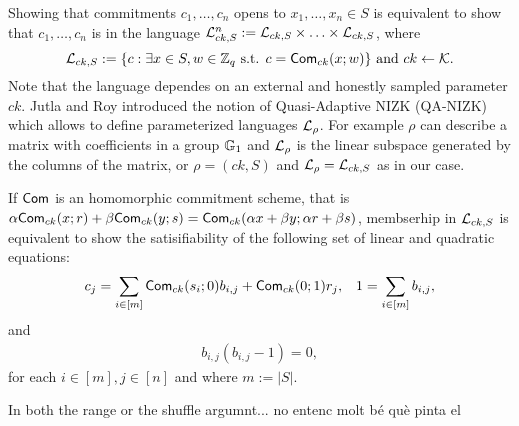 Showing that commitments $c_1,\ldots,c_n$ opens to $x_1,\ldots,x_n\in S$ is equivalent to show that $c_1,\ldots,c_n$ is in the language $\mathcal{L}_{ck,S}^n:=\mathcal{L}_{ck,S}\times\ldots\times\mathcal{L}_{ck,S}$, where
$$
\mathcal{L}_{ck,S}:=\{c:\exists x\in S, w\in\mathbb{Z}_q \text{ s.t. } c=\mathsf{Com}_{ck}(x;w)\}\text{ and }ck\gets\mathcal{K}.
$$
Note that the language dependes on an external and honestly sampled parameter $ck$. Jutla and Roy introduced the notion of Quasi-Adaptive NIZK (QA-NIZK) \cite{AC:JutRoy13} which allows to define parameterized languages $\mathcal{L}_{\rho}$. For example $\rho$ can describe a matrix with coefficients in a group $\mathbb{G}_1$ and $\mathcal{L}_{\rho}$ is the linear subspace generated by the columns of the matrix, or $\rho=(ck,S)$ and $\mathcal{L}_{\rho}=\mathcal{L}_{ck,S}$ as in our case.

If $\mathsf{Com}$ is an homomorphic commitment scheme, that is $\alpha\mathsf{Com}_{ck}(x;r)+\beta\mathsf{Com}_{ck}(y;s)=\mathsf{Com}_{ck}(\alpha x+\beta y;\alpha r + \beta s)$,  membserhip in $\mathcal{L}_{ck,S}$ is equivalent to show the satisifiability of the following set of linear and quadratic equations:
\begin{align}
c_j = \sum_{i\in[m]}\mathsf{Com}_{ck}(s_i;0)b_{i,j}+\mathsf{Com}_{ck}(0;1)r_j,&
& 1= \sum_{i\in[m]}b_{i,j},      \label{eq:lin}
\end{align}
and
\begin{align}
b_{i,j}(b_{i,j}-1)=0 \label{eq:quad},
\end{align}
for each $i\in[m],j\in[n]$ and where $m:=|S|$.

In both the range or the shuffle argumnt... no entenc molt bé què pinta el 









